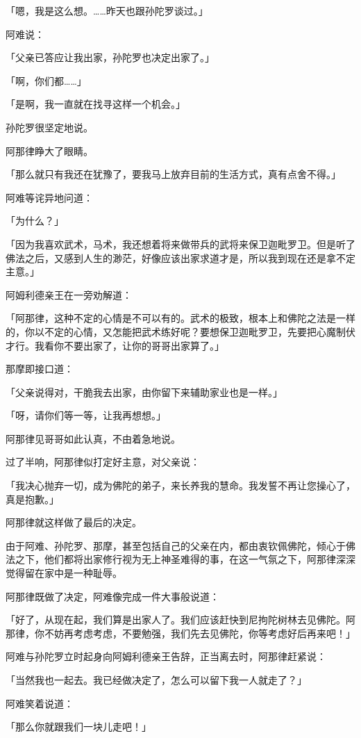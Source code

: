 \documentclass[twoside,openany]{book}
\begin{document}
「嗯，我是这么想。……昨天也跟孙陀罗谈过。」

阿难说：

「父亲已答应让我出家，孙陀罗也决定出家了。」

「啊，你们都……」

「是啊，我一直就在找寻这样一个机会。」

孙陀罗很坚定地说。

阿那律睁大了眼睛。

「那么就只有我还在犹豫了，要我马上放弃目前的生活方式，真有点舍不得。」

阿难等诧异地问道：

「为什么？」

「因为我喜欢武术，马术，我还想着将来做带兵的武将来保卫迦毗罗卫。但是听了佛法之后，又感到人生的渺茫，好像应该出家求道才是，所以我到现在还是拿不定主意。」

阿姆利德亲王在一旁劝解道：

「阿那律，这种不定的心情是不可以有的。武术的极致，根本上和佛陀之法是一样的，你以不定的心情，又怎能把武术练好呢？要想保卫迦毗罗卫，先要把心魔制伏才行。我看你不要出家了，让你的哥哥出家算了。」

那摩即接口道：

「父亲说得对，干脆我去出家，由你留下来辅助家业也是一样。」

「呀，请你们等一等，让我再想想。」

阿那律见哥哥如此认真，不由着急地说。

过了半响，阿那律似打定好主意，对父亲说：

「我决心抛弃一切，成为佛陀的弟子，来长养我的慧命。我发誓不再让您操心了，真是抱歉。」

阿那律就这样做了最后的决定。

由于阿难、孙陀罗、那摩，甚至包括自己的父亲在内，都由衷钦佩佛陀，倾心于佛法之下，他们都将出家修行视为无上神圣难得的事，在这一气氛之下，阿那律深深觉得留在家中是一种耻辱。

阿那律既做了决定，阿难像完成一件大事般说道：

「好了，从现在起，我们算是出家人了。我们应该赶快到尼拘陀树林去见佛陀。阿那律，你不妨再考虑考虑，不要勉强，我们先去见佛陀，你等考虑好后再来吧！」

阿难与孙陀罗立时起身向阿姆利德亲王告辞，正当离去时，阿那律赶紧说：

「当然我也一起去。我已经做决定了，怎么可以留下我一人就走了？」

阿难笑着说道：

「那么你就跟我们一块儿走吧！」
\end{document}
